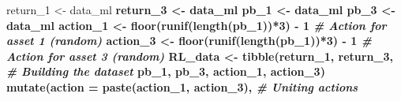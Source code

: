 \documentclass[]{krantz}
\makeatletter
\newenvironment{Shaded}{\begin{snugshade}}{\end{snugshade}}
\newcommand{\CommentTok}[1]{\textcolor[rgb]{0.37,0.37,0.37}{\textit{#1}}}
\newcommand{\DataTypeTok}[1]{\textcolor[rgb]{0.27,0.27,0.27}{#1}}
\newcommand{\DecValTok}[1]{\textcolor[rgb]{0.06,0.06,0.06}{#1}}
\newcommand{\KeywordTok}[1]{\textcolor[rgb]{0.27,0.27,0.27}{\textbf{#1}}}
\newcommand{\NormalTok}[1]{#1}
\newcommand{\OperatorTok}[1]{\textcolor[rgb]{0.43,0.43,0.43}{\textbf{#1}}}
\newcommand{\StringTok}[1]{\textcolor[rgb]{0.5,0.5,0.5}{#1}}
\newenvironment{kframe}{%
\medskip{}
\setlength{\fboxsep}{.8em}
 \def\at@end@of@kframe{}%
 \ifinner\ifhmode%
  \def\at@end@of@kframe{\end{minipage}}%
  \begin{minipage}{\columnwidth}%
 \fi\fi%
 \def\FrameCommand##1{\hskip\@totalleftmargin \hskip-\fboxsep
 \colorbox{shadecolor}{##1}\hskip-\fboxsep
     \hskip-\linewidth \hskip-\@totalleftmargin \hskip\columnwidth}%
 \MakeFramed {\advance\hsize-\width
   \@totalleftmargin\z@ \linewidth\hsize
   \@setminipage}}%
 {\par\unskip\endMakeFramed%
 \at@end@of@kframe}
\renewenvironment{Shaded}{\begin{kframe}}{\end{kframe}}
\theoremstyle{definition}
\theoremstyle{definition}
\theoremstyle{definition}
\theoremstyle{remark}
\makeatother
\begin{document}
\begin{Shaded}
\begin{Highlighting}[]
\NormalTok{return_}\DecValTok{1}\NormalTok{ <-}\StringTok{ }\NormalTok{data_ml }\OperatorTok{%
\NormalTok{return_}\DecValTok{3}\NormalTok{ <-}\StringTok{ }\NormalTok{data_ml }\OperatorTok{%
\NormalTok{pb_}\DecValTok{1}\NormalTok{ <-}\StringTok{ }\NormalTok{data_ml }\OperatorTok{%
\NormalTok{pb_}\DecValTok{3}\NormalTok{ <-}\StringTok{ }\NormalTok{data_ml }\OperatorTok{%
\NormalTok{action_}\DecValTok{1}\NormalTok{ <-}\StringTok{ }\KeywordTok{floor}\NormalTok{(}\KeywordTok{runif}\NormalTok{(}\KeywordTok{length}\NormalTok{(pb_}\DecValTok{1}\NormalTok{))}\OperatorTok{*}\DecValTok{3}\NormalTok{) }\OperatorTok{-}\StringTok{ }\DecValTok{1}                        \CommentTok{# Action for asset 1 (random)}
\NormalTok{action_}\DecValTok{3}\NormalTok{ <-}\StringTok{ }\KeywordTok{floor}\NormalTok{(}\KeywordTok{runif}\NormalTok{(}\KeywordTok{length}\NormalTok{(pb_}\DecValTok{1}\NormalTok{))}\OperatorTok{*}\DecValTok{3}\NormalTok{) }\OperatorTok{-}\StringTok{ }\DecValTok{1}                        \CommentTok{# Action for asset 3 (random)}
\NormalTok{RL_data <-}\StringTok{ }\KeywordTok{tibble}\NormalTok{(return_}\DecValTok{1}\NormalTok{, return_}\DecValTok{3}\NormalTok{,                               }\CommentTok{# Building the dataset}
\NormalTok{                  pb_}\DecValTok{1}\NormalTok{, pb_}\DecValTok{3}\NormalTok{,}
\NormalTok{                  action_}\DecValTok{1}\NormalTok{, action_}\DecValTok{3}\NormalTok{) }\OperatorTok{%
\StringTok{    }\KeywordTok{mutate}\NormalTok{(}\DataTypeTok{action =} \KeywordTok{paste}\NormalTok{(action_}\DecValTok{1}\NormalTok{, action_}\DecValTok{3}\NormalTok{),                      }\CommentTok{# Uniting actions}
}}}}}
\end{Highlighting}
\end{Shaded}
\end{document}
